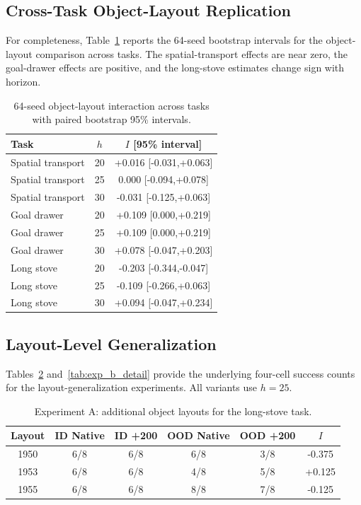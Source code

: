 \documentclass{article}
\begin{document}
\subsection{Cross-Task Object-Layout Replication}

For completeness, Table~\ref{tab:cross_task_bootstrap} reports the 64-seed bootstrap intervals for the object-layout comparison across tasks. The spatial-transport effects are near zero, the goal-drawer effects are positive, and the long-stove estimates change sign with horizon.

\begin{table}[h]
\centering
\small
\caption{64-seed object-layout interaction across tasks with paired bootstrap 95\% intervals.}
\label{tab:cross_task_bootstrap}
\begin{tabular}{l|c|c}
\hline
Task & \(h\) & \(I\) [95\% interval] \\
\hline
Spatial transport & 20 & +0.016 [-0.031,+0.063] \\
Spatial transport & 25 & 0.000 [-0.094,+0.078] \\
Spatial transport & 30 & -0.031 [-0.125,+0.063] \\
\hline
Goal drawer & 20 & +0.109 [0.000,+0.219] \\
Goal drawer & 25 & +0.109 [0.000,+0.219] \\
Goal drawer & 30 & +0.078 [-0.047,+0.203] \\
\hline
Long stove & 20 & -0.203 [-0.344,-0.047] \\
Long stove & 25 & -0.109 [-0.266,+0.063] \\
Long stove & 30 & +0.094 [-0.047,+0.234] \\
\hline
\end{tabular}
\end{table}

\subsection{Layout-Level Generalization}

Tables~\ref{tab:exp_a_detail} and~\ref{tab:exp_b_detail} provide the underlying four-cell success counts for the layout-generalization experiments. All variants use \(h=25\).

\begin{table}[h]
\centering
\small
\caption{Experiment A: additional object layouts for the long-stove task.}
\label{tab:exp_a_detail}
\begin{tabular}{c|cc|cc|c}
\hline
Layout & ID Native & ID +200 & OOD Native & OOD +200 & \(I\) \\
\hline
1950 & 6/8 & 6/8 & 6/8 & 3/8 & -0.375 \\
1953 & 6/8 & 6/8 & 4/8 & 5/8 & +0.125 \\
1955 & 6/8 & 6/8 & 8/8 & 7/8 & -0.125 \\
\hline
\end{tabular}
\end{table}
\end{document}
